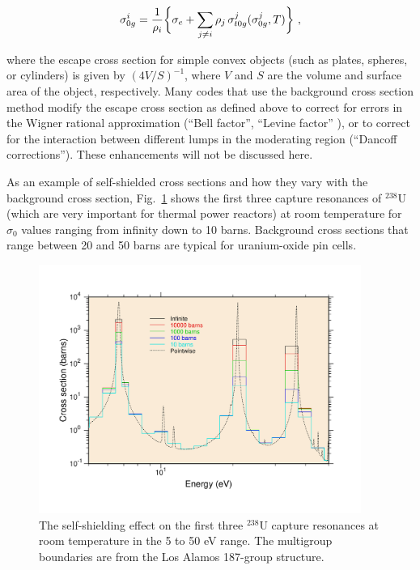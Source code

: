   \begin{equation}
    \sigma_{0g}^i ={{1} \over {\rho_i}}
    \biggl\lbrace \sigma_e +
    \sum_{j\ne i} \rho_j \,\sigma_{t0g}^j
    (\sigma_{0g}^j ,T) \biggr\rbrace \,\,,
  \end{equation}

\noindent
where the escape cross section for simple convex objects (such as plates,
spheres, or cylinders) is given by $(4V{/}S)^{-1}$, where $V$ and $S$
are the volume and surface area of the object, respectively.  Many codes
that use the background cross section method modify the escape cross section
as defined above to correct for errors in the Wigner rational
approximation (``Bell factor'',
``Levine factor'' ), or to correct for
the interaction between different lumps in the moderating region
(``Dancoff corrections'').  These
enhancements will not be discussed here.

As an example of self-shielded cross sections and how they vary
with the background cross section, Fig.~\ref{u238ng} shows the
first three capture resonances of $^{238}$U (which are very important
for thermal power reactors) at room temperature for $\sigma_0$
values ranging from infinity down to 10 barns.  Background cross
sections that range between 20 and 50 barns are typical for
uranium-oxide pin cells.

\begin{figure}[tp]\centering
\includegraphics[keepaspectratio, height=3.2in, angle=0]{figs/u238ngack}
\caption[The self-shielding effect on the first three $^{238}$U capture
 resonances.]{The self-shielding effect on the first three $^{238}$U
 capture resonances at room temperature in the 5 to 50 eV range.  The
 multigroup boundaries are from the Los Alamos 187-group structure.}
\label{u238ng}
\end{figure}

